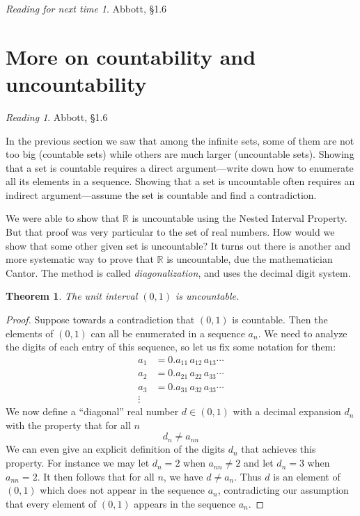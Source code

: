 \documentclass[11pt,oneside]{amsbook}
\newcommand{\R}{\mathbb R}
\theoremstyle{definition}
\theoremstyle{plain}
\newtheorem{theorem}{Theorem}[section]
\theoremstyle{definition}
\theoremstyle{remark}
\newtheorem*{reading}{Reading}
\newtheorem*{readnext}{Reading for next time}
\numberwithin{equation}{section}
\numberwithin{figure}{section}
\begin{document}
\vspace{\fill}
\begin{readnext}
  Abbott, \S 1.6
\end{readnext}

\newpage
\section{More on countability and uncountability}

\begin{reading}
  Abbott, \S 1.6
\end{reading}

In the previous section we saw that among the infinite sets, some of them are not too big (countable sets) while others are much larger (uncountable sets). Showing that a set is countable requires a direct argument---write down how to enumerate all its elements in a sequence. Showing that a set is uncountable often requires an indirect argument---assume the set is countable and find a contradiction.

We were able to show that $\R$ is uncountable using the Nested Interval Property. But that proof was very particular to the set of real numbers. How would we show that some other given set is uncountable? It turns out there is another and more systematic way to prove that $\R$ is uncountable, due the mathematician Cantor. The method is called \emph{diagonalization}, and uses the decimal digit system.

\begin{theorem}
  The unit interval $(0,1)$ is uncountable.
\end{theorem}

\begin{proof}
  Suppose towards a contradiction that $(0,1)$ is countable. Then the elements of $(0,1)$ can all be enumerated in a sequence $a_n$. We need to analyze the digits of each entry of this sequence, so let us fix some notation for them:
  \begin{align*}
    a_1&=0.a_{11}\,a_{12}\,a_{13}\cdots\\
    a_2&=0.a_{21}\,a_{22}\,a_{33}\cdots\\
    a_3&=0.a_{31}\,a_{32}\,a_{33}\cdots\\
    \vdots&
  \end{align*}
  We now define a ``diagonal'' real number $d\in(0,1)$ with a decimal expansion $d_n$ with the property that for all $n$
  \[d_n\neq a_{nn}
  \]
  We can even give an explicit definition of the digits $d_n$ that achieves this property. For instance we may let $d_n=2$ when $a_{nn}\neq2$ and let $d_n=3$ when $a_{nn}=2$. It then follows that for all $n$, we have $d\neq a_n$. Thus $d$ is an element of $(0,1)$ which does not appear in the sequence $a_n$, contradicting our assumption that every element of $(0,1)$ appears in the sequence $a_n$.
\end{proof}
\end{document}
